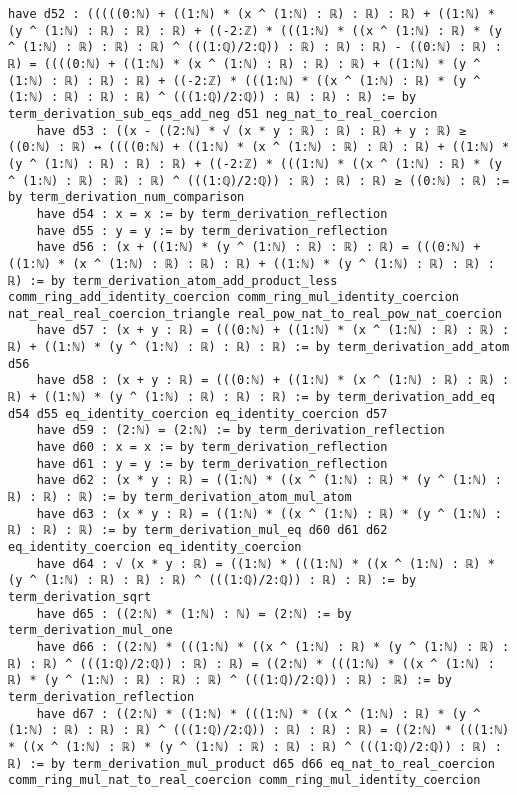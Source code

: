 \documentclass{article}
\begin{document}
\begin{tcolorbox}[colback=white!10, width=\linewidth]
\begin{lstlisting}[language=Lean4]
    have d52 : (((((0:ℕ) + ((1:ℕ) * (x ^ (1:ℕ) : ℝ) : ℝ) : ℝ) + ((1:ℕ) * (y ^ (1:ℕ) : ℝ) : ℝ) : ℝ) + ((-2:ℤ) * (((1:ℕ) * ((x ^ (1:ℕ) : ℝ) * (y ^ (1:ℕ) : ℝ) : ℝ) : ℝ) ^ (((1:ℚ)/2:ℚ)) : ℝ) : ℝ) : ℝ) - ((0:ℕ) : ℝ) : ℝ) = ((((0:ℕ) + ((1:ℕ) * (x ^ (1:ℕ) : ℝ) : ℝ) : ℝ) + ((1:ℕ) * (y ^ (1:ℕ) : ℝ) : ℝ) : ℝ) + ((-2:ℤ) * (((1:ℕ) * ((x ^ (1:ℕ) : ℝ) * (y ^ (1:ℕ) : ℝ) : ℝ) : ℝ) ^ (((1:ℚ)/2:ℚ)) : ℝ) : ℝ) : ℝ) := by term_derivation_sub_eqs_add_neg d51 neg_nat_to_real_coercion
    have d53 : ((x - ((2:ℕ) * √ (x * y : ℝ) : ℝ) : ℝ) + y : ℝ) ≥ ((0:ℕ) : ℝ) ↔ ((((0:ℕ) + ((1:ℕ) * (x ^ (1:ℕ) : ℝ) : ℝ) : ℝ) + ((1:ℕ) * (y ^ (1:ℕ) : ℝ) : ℝ) : ℝ) + ((-2:ℤ) * (((1:ℕ) * ((x ^ (1:ℕ) : ℝ) * (y ^ (1:ℕ) : ℝ) : ℝ) : ℝ) ^ (((1:ℚ)/2:ℚ)) : ℝ) : ℝ) : ℝ) ≥ ((0:ℕ) : ℝ) := by term_derivation_num_comparison
    have d54 : x = x := by term_derivation_reflection
    have d55 : y = y := by term_derivation_reflection
    have d56 : (x + ((1:ℕ) * (y ^ (1:ℕ) : ℝ) : ℝ) : ℝ) = (((0:ℕ) + ((1:ℕ) * (x ^ (1:ℕ) : ℝ) : ℝ) : ℝ) + ((1:ℕ) * (y ^ (1:ℕ) : ℝ) : ℝ) : ℝ) := by term_derivation_atom_add_product_less comm_ring_add_identity_coercion comm_ring_mul_identity_coercion nat_real_real_coercion_triangle real_pow_nat_to_real_pow_nat_coercion
    have d57 : (x + y : ℝ) = (((0:ℕ) + ((1:ℕ) * (x ^ (1:ℕ) : ℝ) : ℝ) : ℝ) + ((1:ℕ) * (y ^ (1:ℕ) : ℝ) : ℝ) : ℝ) := by term_derivation_add_atom d56
    have d58 : (x + y : ℝ) = (((0:ℕ) + ((1:ℕ) * (x ^ (1:ℕ) : ℝ) : ℝ) : ℝ) + ((1:ℕ) * (y ^ (1:ℕ) : ℝ) : ℝ) : ℝ) := by term_derivation_add_eq d54 d55 eq_identity_coercion eq_identity_coercion d57
    have d59 : (2:ℕ) = (2:ℕ) := by term_derivation_reflection
    have d60 : x = x := by term_derivation_reflection
    have d61 : y = y := by term_derivation_reflection
    have d62 : (x * y : ℝ) = ((1:ℕ) * ((x ^ (1:ℕ) : ℝ) * (y ^ (1:ℕ) : ℝ) : ℝ) : ℝ) := by term_derivation_atom_mul_atom
    have d63 : (x * y : ℝ) = ((1:ℕ) * ((x ^ (1:ℕ) : ℝ) * (y ^ (1:ℕ) : ℝ) : ℝ) : ℝ) := by term_derivation_mul_eq d60 d61 d62 eq_identity_coercion eq_identity_coercion
    have d64 : √ (x * y : ℝ) = ((1:ℕ) * (((1:ℕ) * ((x ^ (1:ℕ) : ℝ) * (y ^ (1:ℕ) : ℝ) : ℝ) : ℝ) ^ (((1:ℚ)/2:ℚ)) : ℝ) : ℝ) := by term_derivation_sqrt
    have d65 : ((2:ℕ) * (1:ℕ) : ℕ) = (2:ℕ) := by term_derivation_mul_one
    have d66 : ((2:ℕ) * (((1:ℕ) * ((x ^ (1:ℕ) : ℝ) * (y ^ (1:ℕ) : ℝ) : ℝ) : ℝ) ^ (((1:ℚ)/2:ℚ)) : ℝ) : ℝ) = ((2:ℕ) * (((1:ℕ) * ((x ^ (1:ℕ) : ℝ) * (y ^ (1:ℕ) : ℝ) : ℝ) : ℝ) ^ (((1:ℚ)/2:ℚ)) : ℝ) : ℝ) := by term_derivation_reflection
    have d67 : ((2:ℕ) * ((1:ℕ) * (((1:ℕ) * ((x ^ (1:ℕ) : ℝ) * (y ^ (1:ℕ) : ℝ) : ℝ) : ℝ) ^ (((1:ℚ)/2:ℚ)) : ℝ) : ℝ) : ℝ) = ((2:ℕ) * (((1:ℕ) * ((x ^ (1:ℕ) : ℝ) * (y ^ (1:ℕ) : ℝ) : ℝ) : ℝ) ^ (((1:ℚ)/2:ℚ)) : ℝ) : ℝ) := by term_derivation_mul_product d65 d66 eq_nat_to_real_coercion comm_ring_mul_nat_to_real_coercion comm_ring_mul_identity_coercion

\end{lstlisting}
\end{tcolorbox}
\end{document}
